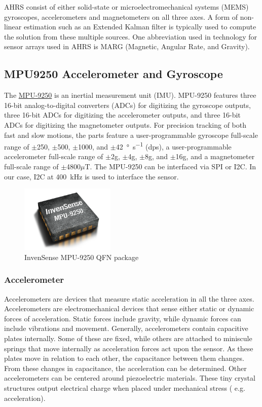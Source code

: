 \documentclass[a4paper,12pt,oneside]{book}
\begin{document}
AHRS consist of either solid-state or microelectromechanical systems (MEMS) gyroscopes, accelerometers and magnetometers on all three axes. A form of non-linear estimation such as an Extended Kalman filter is typically used to compute the solution from these multiple sources. One abbreviation used in technology for sensor arrays used in AHRS is MARG (Magnetic, Angular Rate, and Gravity).\cite{ahrswiki}\\

\subsection{MPU9250 Accelerometer and Gyroscope}
The \href{./datasheets/MPU9250 Datasheet.pdf}{MPU-9250} is an inertial measurement unit (IMU). MPU-9250 features three 16-bit analog-to-digital converters (ADCs) for digitizing the gyroscope outputs, three 16-bit ADCs for digitizing the accelerometer outputs, and three 16-bit ADCs for digitizing the magnetometer outputs. For precision tracking of both fast and slow motions, the parts feature a user-programmable gyroscope full-scale range of $\pm$250, $\pm$500, $\pm$1000, and $\pm$\SI{42}{\degree\per\second} (dps), a user-programmable accelerometer full-scale range of $\pm$2g, $\pm$4g, $\pm$8g, and $\pm$16g, and a magnetometer full-scale range of $\pm$4800$\mu$T. The MPU-9250 can be interfaced via SPI or I2C. In our case, I2C at \SI{400}{\kilo\hertz} is used to interface the sensor.

\begin{figure}[!htb]
\centering
\includegraphics[width=0.4\textwidth]{images/mpu-9250}
\caption{InvenSense MPU-9250 QFN package\cite{mpu9250}}
\end{figure}

\subsubsection{Accelerometer}
Accelerometers are devices that measure static acceleration in all the three axes. Accelerometers are electromechanical devices that sense either static or dynamic forces of acceleration. Static forces include gravity, while dynamic forces can include vibrations and movement. Generally, accelerometers contain capacitive plates internally. Some of these are fixed, while others are attached to miniscule springs that move internally as acceleration forces act upon the sensor. As these plates move in relation to each other, the capacitance between them changes. From these changes in capacitance, the acceleration can be determined. Other accelerometers can be centered around piezoelectric materials. These tiny crystal structures output electrical charge when placed under mechanical stress ( e.g. acceleration).\\
\end{document}
